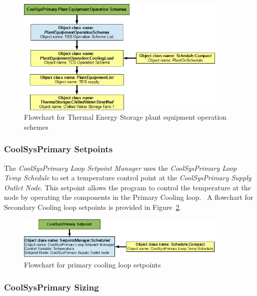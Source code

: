\begin{figure}[htbp] %
\centering
\includegraphics[width=0.9\textwidth, height=0.9\textheight, keepaspectratio=true]{media/image058.png}
\caption{Flowchart for Thermal Energy Storage plant equipment operation schemes \protect \label{fig:flowchart-for-thermal-energy-storage-plant-equipment-operation}}
\end{figure}

\subsubsection{CoolSysPrimary Setpoints}\label{coolsysprimary-setpoints}

The \emph{CoolSysPrimary Loop Setpoint Manager} uses the \emph{CoolSysPrimary Loop Temp Schedule} to set a temperature control point at the \emph{CoolSysPrimary Supply Outlet Node}. This setpoint allows the program to control the temperature at the node by operating the components in the Primary Cooling loop. ~A flowchart for Secondary Cooling loop setpoints is provided in Figure~\ref{fig:flowchart-for-primary-cooling-loop-setpoints-2016-06-17}.

\begin{figure}[htbp] %
\centering
\includegraphics[width=0.9\textwidth, height=0.9\textheight, keepaspectratio=true]{media/image059.png}
\caption{Flowchart for primary cooling loop setpoints \protect \label{fig:flowchart-for-primary-cooling-loop-setpoints-2016-06-17}}
\end{figure}

\subsubsection{CoolSysPrimary Sizing}\label{coolsysprimary-sizing}

